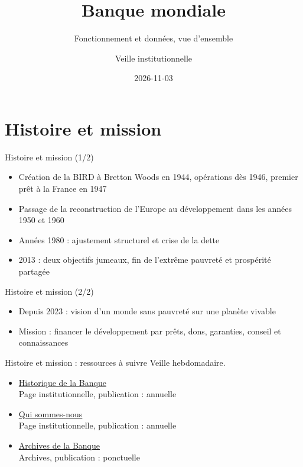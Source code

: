\documentclass[aspectratio=169,11pt]{beamer}
\title{Banque mondiale}
\subtitle{Fonctionnement et données, vue d'ensemble}
\author{Veille institutionnelle}
\date{2026-11-03}
\begin{document}
\begin{frame}\titlepage\end{frame}

\section{Histoire et mission}
\begin{frame}{Histoire et mission (1/2)}
\begin{itemize}
\item Création de la BIRD à Bretton Woods en 1944, opérations dès 1946, premier prêt à la France en 1947
\item Passage de la reconstruction de l'Europe au développement dans les années 1950 et 1960
\item Années 1980 : ajustement structurel et crise de la dette
\item 2013 : deux objectifs jumeaux, fin de l'extrême pauvreté et prospérité partagée
\end{itemize}
\end{frame}

\begin{frame}{Histoire et mission (2/2)}
\begin{itemize}
\item Depuis 2023 : vision d'un monde sans pauvreté sur une planète vivable
\item Mission : financer le développement par prêts, dons, garanties, conseil et connaissances
\end{itemize}
\end{frame}

\begin{frame}{Histoire et mission : ressources à suivre}
\small
Veille hebdomadaire.
\begin{itemize}
\item \href{https://www.worldbank.org/en/about/history}{Historique de la Banque}\\{\footnotesize Page institutionnelle, publication : annuelle}
\item \href{https://www.worldbank.org/en/who-we-are}{Qui sommes-nous}\\{\footnotesize Page institutionnelle, publication : annuelle}
\item \href{https://www.worldbank.org/en/about/archives}{Archives de la Banque}\\{\footnotesize Archives, publication : ponctuelle}
\end{itemize}
\end{frame}
\end{document}
